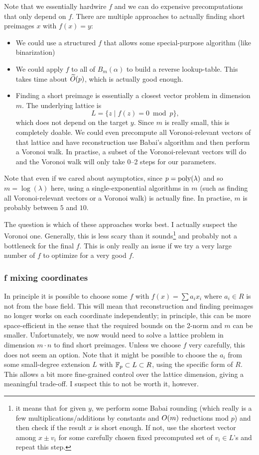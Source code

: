 \documentclass{article}
\begin{document}
Note that we essentially hardwire $f$ and we can do expensive precomputations that only depend on $f$. There are multiple approaches to actually finding short preimages $x$ with $f(x) = y$:
\begin{itemize}
 \item We could use a structured $f$ that allows some special-purpose algorithm (like binarization)
 \item We could apply $f$ to all of $B_m(\alpha)$ to build a reverse lookup-table. This takes time about $\widetilde{O}(p)$, which is actually good enough.
 \item Finding a short preimage is essentially a closest vector problem in dimension $m$. The underlying lattice is \[L=\{z \mid f(z) = 0 \bmod p\},\] which does not depend on the target $y$. Since $m$ is really small, this is completely doable. We could even precompute all Voronoi-relevant vectors of that lattice and have reconstruction use Babai's algorithm and then perform a Voronoi walk. In practise, a subset of the Voronoi-relevant vectors will do and the Voronoi walk will only take 0--2 steps for our parameters.
\end{itemize}
Note that even if we cared about asymptotics, since $p=\textnormal{poly}(\lambda)$ and so $m=\log(\lambda)$ here, using a single-exponential algorithms in $m$ (such as finding all Voronoi-relevant vectors or a Voronoi walk) is actually fine. In practise, $m$ is probably between $5$ and $10$.

The question is which of these approaches works best. I actually suspect the Voronoi one. Generally, this is less scary than it sounds\footnote{it means that for given $y$, we perform some Babai rounding (which really is a few multiplications/additions by constants and $O(m)$ reductions mod $p$) and then check if the result $x$ is short enough. If not, use the shortest vector among $x\pm v_i$ for some carefully chosen fixed precomputed set of $v_i\in L$'s and repeat this step.} and probably not a bottleneck for the final $f$. This is only really an issue if we try a very large number of $f$ to optimize for a very good $f$.

\subsubsection{f mixing coordinates}

In principle it is possible to choose some $f$ with $f(x) = \sum a_i x_i$ where $a_i\in R$ is not from the base field. This will mean that reconstruction and finding preimages no longer works on each coordinate independently; in principle, this can be more space-efficient in the sense that the required bounds on the 2-norm and $m$ can be smaller. Unfortunately, we now would need to solve a lattice problem in dimension $m \cdot n$ to find short preimages. Unless we choose $f$ very carefully, this does not seem an option. Note that it might be possible to choose the $a_i$ from some small-degree extension $L$ with ${\mathbb{F}}_p \subset L \subset R$, using the specific form of $R$. This allows a bit more fine-grained control over the lattice dimension, giving a meaningful trade-off. I suspect this to not be worth it, however.
\end{document}
